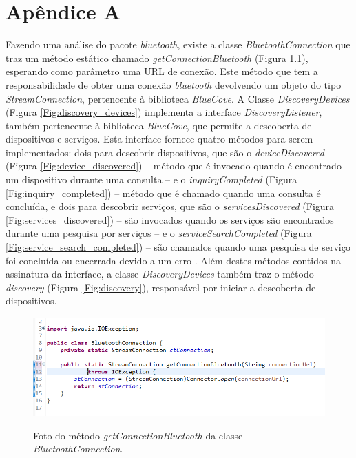 \chapter{Apêndice A}\label{apendicea}

Fazendo uma análise do pacote \textit{bluetooth}, existe a classe \textit{BluetoothConnection} que traz um método estático chamado \textit{getConnectionBluetooth} (Figura \ref{Fig:get_connection_bluetooth}), esperando como parâmetro uma URL de conexão. Este método que tem a responsabilidade de obter uma conexão \textit{bluetooth} devolvendo um objeto do tipo \textit{StreamConnection}, pertencente à biblioteca \textit{BlueCove}. A Classe \textit{DiscoveryDevices} (Figura \ref{Fig:discovery_devices}) implementa a interface \textit{DiscoveryListener}, também pertencente à biblioteca \textit{BlueCove}, que permite a descoberta de dispositivos e serviços. Esta interface fornece quatro métodos para serem implementados: dois para descobrir dispositivos, que são o \textit{deviceDiscovered} (Figura \ref{Fig:device_discovered}) – método que é invocado quando é encontrado um dispositivo durante uma consulta – e o \textit{inquiryCompleted} (Figura \ref{Fig:inquiry_completed}) – método que é chamado quando uma consulta é concluída, e dois para descobrir serviços, que são o \textit{servicesDiscovered} (Figura \ref{Fig:services_discovered}) – são invocados quando os serviços são encontrados durante uma pesquisa por serviços – e o \textit{serviceSearchCompleted} (Figura \ref{Fig:service_search_completed}) – são chamados quando uma pesquisa de serviço foi concluída ou encerrada devido a um erro \cite{bluecovedoc}. Além destes métodos contidos na assinatura da interface, a classe \textit{DiscoveryDevices} também traz o método \textit{discovery} (Figura \ref{Fig:discovery}), responsável por iniciar a descoberta de dispositivos.

\begin{figure}[!ht]
\centering
\caption{Foto do método \textit{getConnectionBluetooth} da classe \textit{BluetoothConnection}.} 
{\includegraphics[scale=.80]{imagens/pacoteBluetooth-BluetoothConnection.png}}\\
 \label{Fig:get_connection_bluetooth}
\end{figure}

